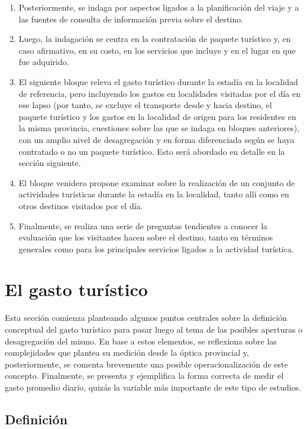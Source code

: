 \documentclass[
]{book}
\begin{document}
\begin{enumerate}
\item
  Posteriormente, se indaga por aspectos ligados a la planificación del viaje y a las fuentes de consulta de información previa sobre el destino.
\item
  Luego, la indagación se centra en la contratación de paquete turístico y, en caso afirmativo, en su costo, en los servicios que incluye y en el lugar en que fue adquirido.
\item
  El siguiente bloque releva el gasto turístico durante la estadía en la localidad de referencia, pero incluyendo los gastos en localidades visitadas por el día en ese lapso (por tanto, se excluye el transporte desde y hacia destino, el paquete turístico y los gastos en la localidad de origen para los residentes en la misma provincia, cuestiones sobre las que se indaga en bloques anteriores), con un amplio nivel de desagregación y en forma diferenciada según se haya contratado o no un paquete turístico. Esto será abordado en detalle en la sección siguiente.
\item
  El bloque venidero propone examinar sobre la realización de un conjunto de actividades turísticas durante la estadía en la localidad, tanto allí como en otros destinos visitados por el día.
\item
  Finalmente, se realiza una serie de preguntas tendientes a conocer la evaluación que los visitantes hacen sobre el destino, tanto en términos generales como para los principales servicios ligados a la actividad turística.
\end{enumerate}

\hypertarget{el-gasto-turuxedstico}{%
\section{El gasto turístico}\label{el-gasto-turuxedstico}}

Esta sección comienza planteando algunos puntos centrales sobre la definición conceptual del gasto turístico para pasar luego al tema de las posibles aperturas o desagregación del mismo. En base a estos elementos, se reflexiona sobre las complejidades que plantea su medición desde la óptica provincial y, posteriormente, se comenta brevemente una posible operacionalización de este concepto. Finalmente, se presenta y ejemplifica la forma correcta de medir el gasto promedio diario, quizás la variable más importante de este tipo de estudios.

\hypertarget{definiciuxf3n}{%
\subsection{Definición}\label{definiciuxf3n}}
\end{document}
